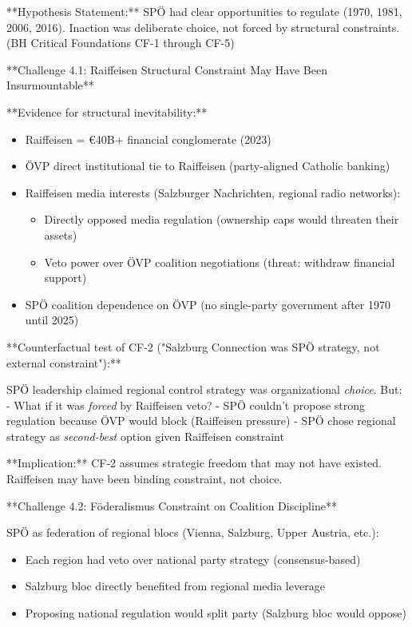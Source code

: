 **Hypothesis Statement:** SPÖ had clear opportunities to regulate (1970, 1981, 2006, 2016). Inaction was deliberate choice, not forced by structural constraints. (BH Critical Foundations CF-1 through CF-5)

**Challenge 4.1: Raiffeisen Structural Constraint May Have Been Insurmountable**

**Evidence for structural inevitability:**

\begin{itemize}
\item Raiffeisen = €40B+ financial conglomerate (2023)
\item ÖVP direct institutional tie to Raiffeisen (party-aligned Catholic banking)
\item Raiffeisen media interests (Salzburger Nachrichten, regional radio networks):
  \begin{itemize}
  \item Directly opposed media regulation (ownership caps would threaten their assets)
  \item Veto power over ÖVP coalition negotiations (threat: withdraw financial support)
  \end{itemize}
\item SPÖ coalition dependence on ÖVP (no single-party government after 1970 until 2025)
\end{itemize}

**Counterfactual test of CF-2 ("Salzburg Connection was SPÖ strategy, not external constraint"):**

SPÖ leadership claimed regional control strategy was organizational \textit{choice}. But:
- What if it was \textit{forced} by Raiffeisen veto?
- SPÖ couldn't propose strong regulation because ÖVP would block (Raiffeisen pressure)
- SPÖ chose regional strategy as \textit{second-best} option given Raiffeisen constraint

**Implication:** CF-2 assumes strategic freedom that may not have existed. Raiffeisen may have been binding constraint, not choice.

**Challenge 4.2: Föderalismus Constraint on Coalition Discipline**

SPÖ as federation of regional blocs (Vienna, Salzburg, Upper Austria, etc.):
\begin{itemize}
\item Each region had veto over national party strategy (consensus-based)
\item Salzburg bloc directly benefited from regional media leverage
\item Proposing national regulation would split party (Salzburg bloc would oppose)
\end{itemize}

